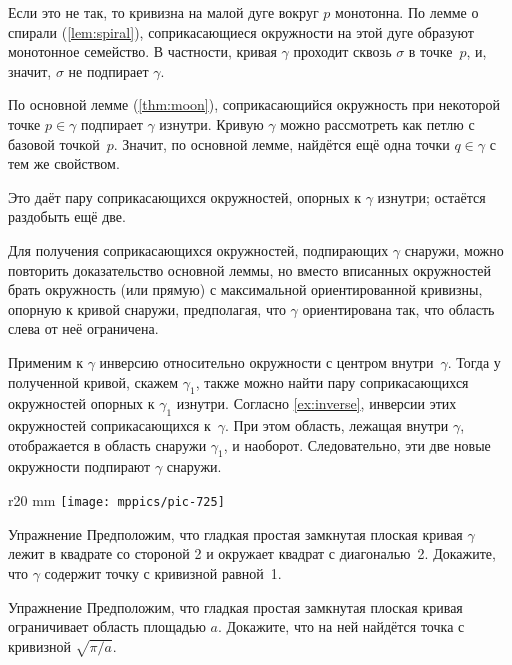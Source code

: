 Если это не так, то кривизна на малой дуге вокруг $p$ монотонна.
По лемме о спирали (\ref{lem:spiral}), соприкасающиеся окружности на этой дуге образуют монотонное семейство.
В частности, кривая $\gamma$ проходит сквозь $\sigma$ в точке~$p$, и, значит, $\sigma$ не подпирает $\gamma$.
\qeds

По основной лемме (\ref{thm:moon}), соприкасающийся окружность при некоторой точке $p\in\gamma$ подпирает $\gamma$ изнутри.
Кривую $\gamma$ можно рассмотреть как петлю с базовой точкой~$p$.
Значит, по основной лемме, найдётся ещё одна точки $q\in\gamma$ с тем же свойством.

Это даёт пару соприкасающихся окружностей, опорных к $\gamma$ изнутри;
остаётся раздобыть ещё две.

Для получения соприкасающихся окружностей, подпирающих $\gamma$ снаружи, можно повторить доказательство основной леммы, но вместо вписанных окружностей брать окружность (или прямую) с максимальной ориентированной кривизны, опорную к кривой снаружи, предполагая, что $\gamma$ ориентирована так, что область слева от неё ограничена.
\qeds

 Применим к $\gamma$ инверсию относительно окружности с центром внутри~$\gamma$. Тогда у полученной кривой, скажем $\gamma_1$, также можно найти пару соприкасающихся окружностей опорных к $\gamma_1$ изнутри.
Согласно \ref{ex:inverse}, инверсии этих окружностей соприкасающихся к~$\gamma$.
При этом область, лежащая внутри $\gamma$, отображается в область снаружи $\gamma_1$, и наоборот.
Следовательно, эти две новые окружности подпирают $\gamma$ снаружи.\qeds


{

\begin{wrapfigure}{r}{20 mm}
\vskip-0mm
\centering
\texttt{[image: mppics/pic-725]}
\vskip0mm
\end{wrapfigure}

\begin{thm}{Упражнение}\label{ex:2-squares}
Предположим, что гладкая простая замкнутая плоская кривая \(\gamma\) лежит в квадрате со стороной 2 и окружает квадрат с диагональю~2.
Докажите, что \(\gamma\) содержит точку с кривизной равной~1.
\end{thm}

}

\begin{thm}{Упражнение}\label{ex:moon-area}
Предположим, что гладкая простая замкнутая плоская кривая ограничивает область площадью $a$.
Докажите, что на ней найдётся точка с кривизной $\sqrt{\pi/a}$.
\end{thm}


